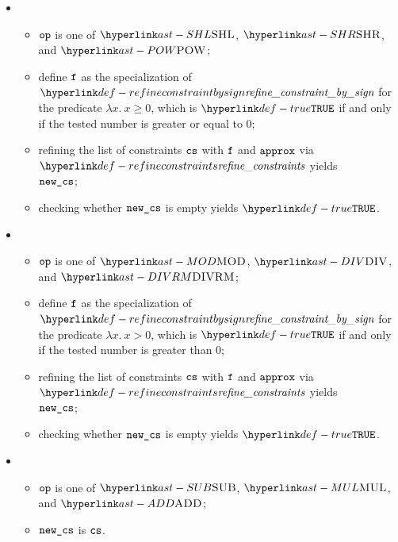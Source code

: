 \ProseParagraph
\OneApplies
\begin{itemize}
  \item {}
  \begin{itemize}
    \item $\op$ is one of $\SHL$, $\SHR$, and $\POW$;
    \item define $\vf$ as the specialization of $\refineconstraintbysign$ for the predicate
          $\lambda x.\ x \geq 0$, which is $\True$ if and only if the tested number is greater or equal to $0$;
    \item refining the list of constraints $\cs$ with $\vf$ and $\vapprox$ via $\refineconstraints$ yields \\
          $\newcs$\ProseTerminateAs{\CannotUnderapproximate, \CannotOverapproximate};
    \item checking whether $\newcs$ is empty yields $\True$\ProseTerminateAs{\BadOperands}.
  \end{itemize}

  \item {}
  \begin{itemize}
    \item $\op$ is one of $\MOD$, $\DIV$, and $\DIVRM$;
    \item define $\vf$ as the specialization of $\refineconstraintbysign$ for the predicate
          $\lambda x.\ x > 0$, which is $\True$ if and only if the tested number is greater than $0$;
    \item refining the list of constraints $\cs$ with $\vf$ and $\vapprox$ via $\refineconstraints$ yields \\
          $\newcs$\ProseTerminateAs{\CannotUnderapproximate, \CannotOverapproximate};
    \item checking whether $\newcs$ is empty yields $\True$\ProseTerminateAs{\BadOperands}.
  \end{itemize}

  \item {}
  \begin{itemize}
    \item $\op$ is one of $\SUB$, $\MUL$, and $\ADD$;
    \item $\newcs$ is $\cs$.
  \end{itemize}
\end{itemize}

\FormallyParagraph
\begin{mathpar}
\end{mathpar}

